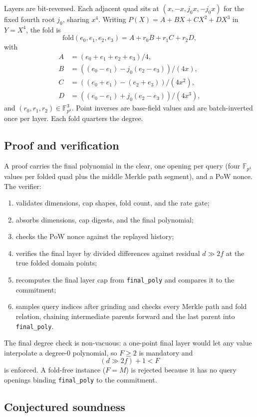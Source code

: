 \documentclass[11pt,a4paper]{article}
\newcommand{\zFpFour}{\mathbb{F}_{p^4}}
\newcommand{\zfold}{\mathrm{fold}}
\begin{document}
Layers are bit-reversed. Each adjacent quad sits at
$(x,-x,j_0x,-j_0x)$ for the fixed fourth root $j_0$, sharing $x^4$. Writing
$P(X)=A+BX+CX^2+DX^3$ in $Y=X^4$, the fold is
\[
\zfold(e_0,e_1,e_2,e_3)=A+r_0B+r_1C+r_2D,
\]
with
\[
\begin{aligned}
A&=(e_0+e_1+e_2+e_3)/4,\\
B&=((e_0-e_1)-j_0(e_2-e_3))/(4x),\\
C&=((e_0+e_1)-(e_2+e_3))/(4x^2),\\
D&=((e_0-e_1)+j_0(e_2-e_3))/(4x^3),
\end{aligned}
\]
and $(r_0,r_1,r_2)\in\zFpFour^3$. Point inverses are base-field values and are
batch-inverted once per layer. Each fold quarters the degree.

\subsection{Proof and verification}

A proof carries the final polynomial in the clear, one opening per query
(four $\zFpFour$ values per folded quad plus the middle Merkle path segment), and
a PoW nonce. The verifier:
\begin{enumerate}[leftmargin=1.3em]
\item validates dimensions, cap shapes, fold count, and the rate gate;
\item absorbs dimensions, cap digests, and the final polynomial;
\item checks the PoW nonce against the replayed history;
\item verifies the final layer by divided differences against residual
$d\gg 2f$ at the true folded domain points;
\item recomputes the final layer cap from \texttt{final\_poly} and compares
it to the commitment;
\item samples query indices after grinding and checks every Merkle path and
fold relation, chaining intermediate parents forward and the last parent
into \texttt{final\_poly}.
\end{enumerate}

The final degree check is non-vacuous: a one-point final layer would let any
value interpolate a degree-0 polynomial, so $F\ge 2$ is mandatory and
\[
(d\gg 2f)+1<F
\]
is enforced. A fold-free instance ($F=M$) is rejected because it has no query
openings binding \texttt{final\_poly} to the commitment.

\subsection{Conjectured soundness}
\end{document}
